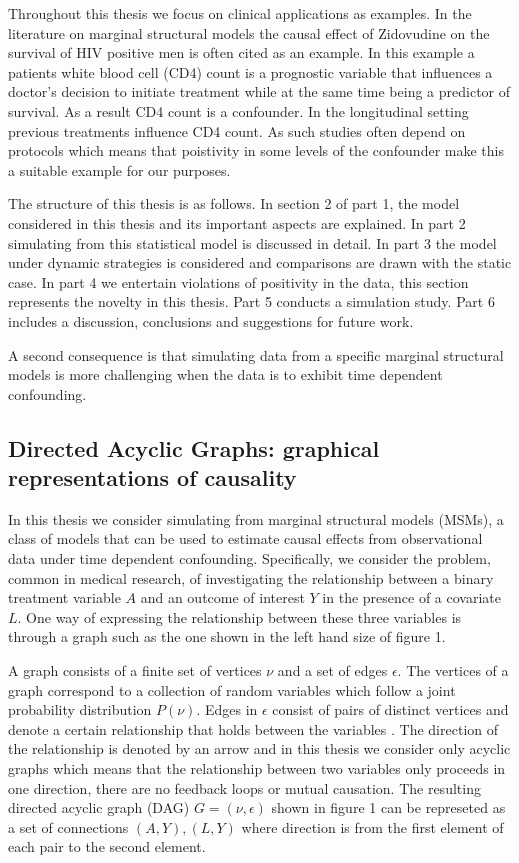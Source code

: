 \documentclass[11pt]{article}
\begin{document}
Throughout this thesis we focus on clinical applications as examples. In
the literature on marginal structural models the causal effect of
Zidovudine on the survival of HIV positive men is often cited as an
example. In this example a patients white blood cell (CD4) count is a
prognostic variable that influences a doctor's decision to initiate
treatment while at the same time being a predictor of survival. As a
result CD4 count is a confounder. In the longitudinal setting previous
treatments influence CD4 count. As such studies often depend on
protocols which means that poistivity in some levels of the confounder
make this a suitable example for our purposes.

The structure of this thesis is as follows. In section 2 of part 1, the
model considered in this thesis and its important aspects are explained.
In part 2 simulating from this statistical model is discussed in detail.
In part 3 the model under dynamic strategies is considered and
comparisons are drawn with the static case. In part 4 we entertain
violations of positivity in the data, this section represents the
novelty in this thesis. Part 5 conducts a simulation study. Part 6
includes a discussion, conclusions and suggestions for future work.

A second consequence is that simulating data from a specific marginal
structural models is more challenging when the data is to exhibit time
dependent confounding.

    \subsection{Directed Acyclic Graphs: graphical representations of
causality}\label{directed-acyclic-graphs-graphical-representations-of-causality}

In this thesis we consider simulating from marginal structural models
(MSMs), a class of models that can be used to estimate causal effects
from observational data under time dependent confounding. Specifically,
we consider the problem, common in medical research, of investigating
the relationship between a binary treatment variable \(A\) and an
outcome of interest \(Y\) in the presence of a covariate \(L\). One way
of expressing the relationship between these three variables is through
a graph such as the one shown in the left hand size of figure 1.

A graph consists of a finite set of vertices \(\nu\) and a set of edges
\(\epsilon\). The vertices of a graph correspond to a collection of
random variables which follow a joint probability distribution
\(P(\nu)\). Edges in \(\epsilon\) consist of pairs of distinct vertices
and denote a certain relationship that holds between the variables
\citet{Pearl2009}. The direction of the relationship is denoted by an
arrow and in this thesis we consider only acyclic graphs which means
that the relationship between two variables only proceeds in one
direction, there are no feedback loops or mutual causation. The
resulting directed acyclic graph (DAG) \(G = (\nu, \epsilon)\) shown in
figure 1 can be represeted as a set of connections \({(A, Y), (L, Y)}\)
where direction is from the first element of each pair to the second
element.
\end{document}
